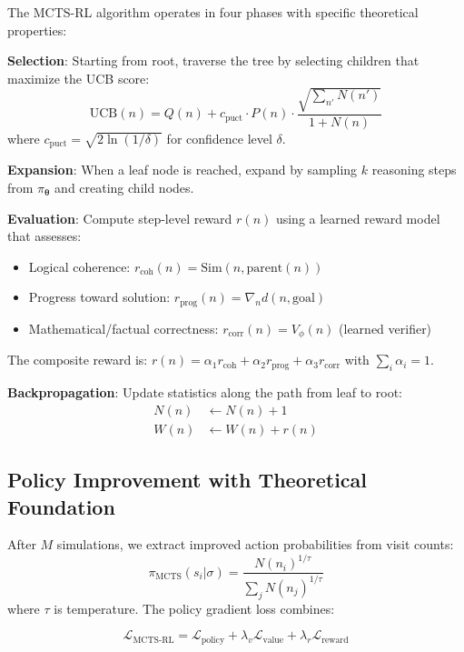 \documentclass[11pt,a4paper]{article}
\newcommand{\calL}{\mathcal{L}}
\newcommand{\btheta}{\bm{\theta}}
\begin{document}
The MCTS-RL algorithm operates in four phases with specific theoretical properties:

\textbf{Selection}: Starting from root, traverse the tree by selecting children that maximize the UCB score:
\begin{equation}
    \text{UCB}(n) = Q(n) + c_{\text{puct}} \cdot P(n) \cdot \frac{\sqrt{\sum_{n'} N(n')}}{1 + N(n)}
\end{equation}
where $c_{\text{puct}} = \sqrt{2\ln(1/\delta)}$ for confidence level $\delta$.

\textbf{Expansion}: When a leaf node is reached, expand by sampling $k$ reasoning steps from $\pi_\btheta$ and creating child nodes.

\textbf{Evaluation}: Compute step-level reward $r(n)$ using a learned reward model that assesses:
\begin{itemize}
    \item Logical coherence: $r_{\text{coh}}(n) = \text{Sim}(n, \text{parent}(n))$
    \item Progress toward solution: $r_{\text{prog}}(n) = \nabla_n d(n, \text{goal})$
    \item Mathematical/factual correctness: $r_{\text{corr}}(n) = V_\phi(n)$ (learned verifier)
\end{itemize}

The composite reward is: $r(n) = \alpha_1 r_{\text{coh}} + \alpha_2 r_{\text{prog}} + \alpha_3 r_{\text{corr}}$ with $\sum_i \alpha_i = 1$.

\textbf{Backpropagation}: Update statistics along the path from leaf to root:
\begin{align}
    N(n) &\leftarrow N(n) + 1 \\
    W(n) &\leftarrow W(n) + r(n)
\end{align}

\subsection{Policy Improvement with Theoretical Foundation}

After $M$ simulations, we extract improved action probabilities from visit counts:
\begin{equation}
    \pi_{\text{MCTS}}(s_i | \sigma) = \frac{N(n_i)^{1/\tau}}{\sum_j N(n_j)^{1/\tau}}
\end{equation}
where $\tau$ is temperature. The policy gradient loss combines:

\begin{equation}
    \calL_{\text{MCTS-RL}} = \calL_{\text{policy}} + \lambda_v \calL_{\text{value}} + \lambda_r \calL_{\text{reward}}
\end{equation}
\end{document}
